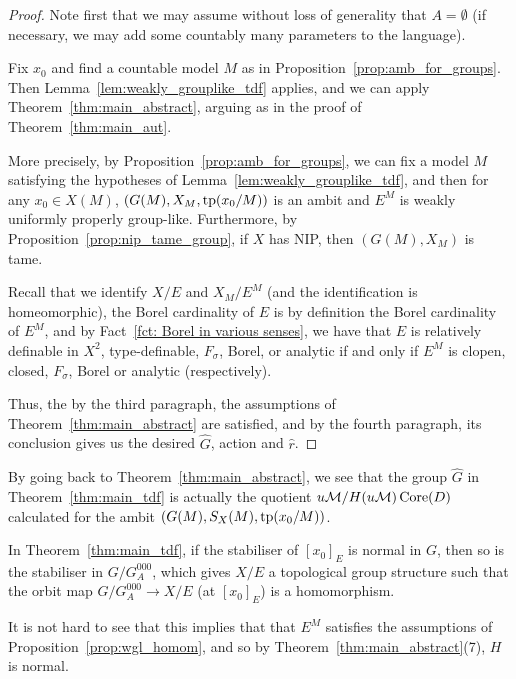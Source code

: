 	\begin{proof}
		Note first that we may assume without loss of generality that $A=\emptyset$ (if necessary, we may add some countably many parameters to the language).
		
		Fix $x_0$ and find a countable model $M$ as in Proposition~\ref{prop:amb_for_groups}. Then Lemma~\ref{lem:weakly_grouplike_tdf} applies, and we can apply Theorem~\ref{thm:main_abstract}, arguing as in the proof of Theorem~\ref{thm:main_aut}.
		
		More precisely, by Proposition~\ref{prop:amb_for_groups}, we can fix a model $M$ satisfying the hypotheses of Lemma~\ref{lem:weakly_grouplike_tdf}, and then for any $x_0\in X(M)$, $(G(M),X_M,\operatorname{{tp}}(x_0/M))$ is an ambit and $E^M$ is weakly uniformly properly group-like. Furthermore, by Proposition~\ref{prop:nip_tame_group}, if $X$ has NIP, then $(G(M),X_M)$ is tame.
		
		Recall that we identify $X/E$ and $X_M/E^M$ (and the identification is homeomorphic), the Borel cardinality of $E$ is by definition the Borel cardinality of $E^M$, and by Fact~\ref{fct: Borel in various senses}, we have that $E$ is relatively definable in $X^2$, type-definable, $F_\sigma$, Borel, or analytic if and only if $E^M$ is clopen, closed, $F_\sigma$, Borel or analytic (respectively).
		
		Thus, the by the third paragraph, the assumptions of Theorem~\ref{thm:main_abstract} are satisfied, and by the fourth paragraph, its conclusion gives us the desired $\hat G$, action and $\hat r$.
	\end{proof}
	
	\begin{rem}
		By going back to Theorem~\ref{thm:main_abstract}, we see that the group $\hat G$ in Theorem~\ref{thm:main_tdf} is actually the quotient $u{\mathcal M}/H(u{\mathcal M})\operatorname{{Core}}(D)$ calculated for the ambit $(G(M),S_X(M),\operatorname{{tp}}(x_0/M))$.
		\xqed{\lozenge}
	\end{rem}
	
	\begin{rem}
		In Theorem~\ref{thm:main_tdf}, if the stabiliser of $[x_0]_E$ is normal in $G$, then so is the stabiliser in $G/G^{000}_A$, which gives $X/E$ a topological group structure such that the orbit map $G/G^{000}_A\to X/E$ (at $[x_0]_E$) is a homomorphism.
		
		It is not hard to see that this implies that that $E^M$ satisfies the assumptions of Proposition~\ref{prop:wgl_homom}, and so by Theorem~\ref{thm:main_abstract}(7), $H$ is normal.\xqed{\lozenge}
	\end{rem}
	
